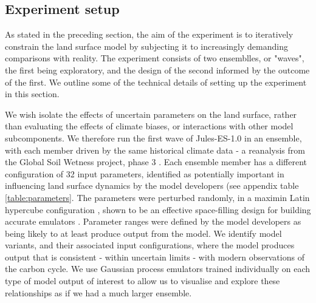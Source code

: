 \documentclass[gmd, manuscript]{copernicus}
\begin{document}
\subsection {Experiment setup}\label{ssec:experiment_setup}

As stated in the preceding section, the aim of the experiment is to iteratively constrain the land surface model by subjecting it to increasingly demanding comparisons with reality. The experiment consists of two ensemblles, or "waves", the first being exploratory, and the design of the second informed by the outcome of the first.  We outline some of the technical details of setting up the experiment in this section.

We wish isolate the effects of uncertain parameters on the land surface, rather than evaluating the effects of climate biases, or interactions with other model subcomponents. We therefore run the first wave of Jules-ES-1.0 in an ensemble, with each member driven by the same historical climate data - a reanalysis from the Global Soil Wetness project, phase 3 \citep{kim2017global}. Each ensemble member has a different configuration of 32 input parameters, identified as potentially important in influencing land surface dynamics by the model developers (see appendix table \ref{table:parameters}. The parameters were perturbed randomly, in a maximin Latin hypercube configuration \citep{mckay1979comparison}, shown to be an effective space-filling design for building accurate emulators \citep{urban2010comparison}. Parameter ranges were defined by the model developers as being likely to at least produce output from the model. We identify model variants, and their associated input configurations, where the model produces output that is consistent - within uncertain limits - with modern observations of the carbon cycle. We use Gaussian process emulators trained individually on each type of model output of interest to allow us to visualise and explore these relationships as if we had a much larger ensemble.


\end{document}
